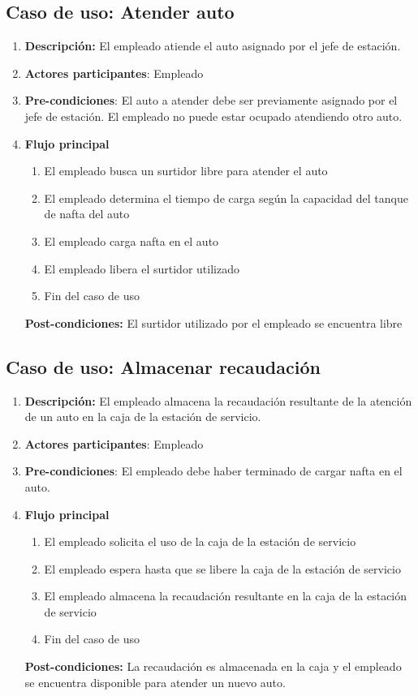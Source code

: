\documentclass[12pt,a4paper,titlepage,oneside]{article}
\begin{document}
\subsection{Caso de uso: Atender auto}

\begin{enumerate}
\item \textbf{Descripción:} El empleado atiende el auto asignado por el jefe de estación.
\item \textbf{Actores participantes}: Empleado
\item \textbf{Pre-condiciones}: El auto a atender debe ser previamente asignado por el jefe de estación. El empleado no puede estar ocupado atendiendo otro auto.
\item \textbf{Flujo principal}
\begin{enumerate}
\item El empleado busca un surtidor libre para atender el auto
\item El empleado determina el tiempo de carga según la capacidad del tanque de nafta del auto
\item El empleado carga nafta en el auto
\item El empleado libera el surtidor utilizado
\item Fin del caso de uso
\end{enumerate}
\textbf{Post-condiciones:} El surtidor utilizado por el empleado se encuentra libre
\end{enumerate}

\subsection{Caso de uso: Almacenar recaudación}

\begin{enumerate}
\item \textbf{Descripción:} El empleado almacena la recaudación resultante de la atención de un auto en la caja de la estación de servicio.
\item \textbf{Actores participantes}: Empleado
\item \textbf{Pre-condiciones}: El empleado debe haber terminado de cargar nafta en el auto.
\item \textbf{Flujo principal}
\begin{enumerate}
\item El empleado solicita el uso de la caja de la estación de servicio
\item El empleado espera hasta que se libere la caja de la estación de servicio
\item El empleado almacena la recaudación resultante en la caja de la estación de servicio
\item Fin del caso de uso
\end{enumerate}
\textbf{Post-condiciones:} La recaudación es almacenada en la caja y el empleado se encuentra disponible para atender un nuevo auto.
\end{enumerate}
\end{document}
